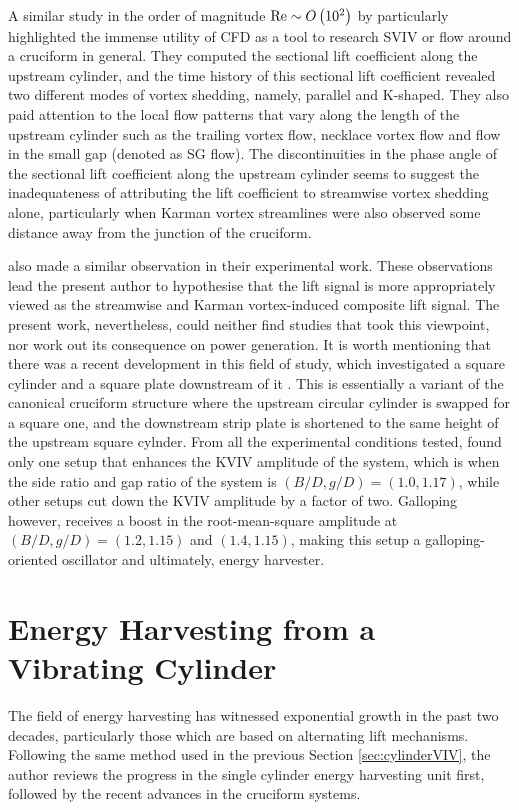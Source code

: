 \documentclass[oneside]{utmthesis}
\begin{document}
A similar study in the order of magnitude $\text{Re} \sim O \left( 10^{2} \right)$ by \citet{Zhao2018a} particularly highlighted the immense utility of CFD as a tool to research SVIV or flow around a cruciform in general. They computed the sectional lift coefficient along the upstream cylinder, and the time history of this sectional lift coefficient revealed two different modes of vortex shedding, namely, parallel and K-shaped. They also paid attention to the local flow patterns that vary along the length of the upstream cylinder such as the trailing vortex flow, necklace vortex flow and flow in the small gap (denoted as SG flow). The discontinuities in the phase angle of the sectional lift coefficient along the upstream cylinder seems to suggest the inadequateness of attributing the lift coefficient to streamwise vortex shedding alone, particularly when Karman vortex streamlines were also observed some distance away from the junction of the cruciform.

\citet{Shirakashi1989} also made a similar observation in their experimental work. These observations lead the present author to hypothesise that the lift signal is more appropriately viewed as the streamwise and Karman vortex-induced composite lift signal. The present work, nevertheless, could neither find studies that took this viewpoint, nor work out its consequence on power generation. It is worth mentioning that there was a recent development in this field of study, which investigated a square cylinder and a square plate downstream of it \citep{Mohamed2021}. This is essentially a variant of the canonical cruciform structure where the upstream circular cylinder is swapped for a square one, and the downstream strip plate is shortened to the same height of the upstream square cylnder. From all the experimental conditions tested, \citet{Mohamed2021} found only one setup that enhances the KVIV amplitude of the system, which is when the side ratio and gap ratio of the system is $(B/D, g/D) = (1.0, 1.17)$, while other setups cut down the KVIV amplitude by a factor of two. Galloping however, receives a boost in the root-mean-square amplitude at $(B/D, g/D) = (1.2, 1.15)$ and $(1.4, 1.15)$, making this setup a galloping-oriented oscillator and ultimately, energy harvester.

\section{Energy Harvesting from a Vibrating Cylinder} \label{sec:energyHarvesting}
The field of energy harvesting has witnessed exponential growth in the past two decades, particularly those which are based on alternating lift mechanisms. Following the same method used in the previous Section \ref{sec:cylinderVIV}, the author reviews the progress in the single cylinder energy harvesting unit first, followed by the recent advances in the cruciform systems.
\end{document}
